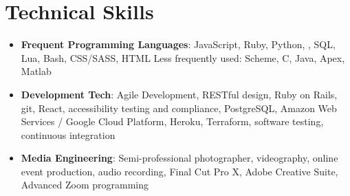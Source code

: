 \section{Technical Skills}

\vspace{6pt}

\begin{itemize}

  \setlength\itemsep{1em}
    \item{\textbf{Frequent Programming Languages}: JavaScript, Ruby, Python, \snap, SQL, Lua, Bash, CSS/SASS, HTML
    \newline
    \small{Less frequently used: Scheme, C, Java, Apex, Matlab}}
    
    \item{\textbf{Development Tech}: Agile Development, RESTful design, Ruby on Rails, git, React, accessibility testing and compliance, PostgreSQL, Amazon Web Services / Google Cloud Platform, Heroku, Terraform, software testing, continuous integration}
    
    \item{\textbf{Media Engineering}: Semi-professional photographer, videography, online event production, audio recording, Final Cut Pro X, Adobe Creative Suite, Advanced Zoom programming}


\end{itemize}








